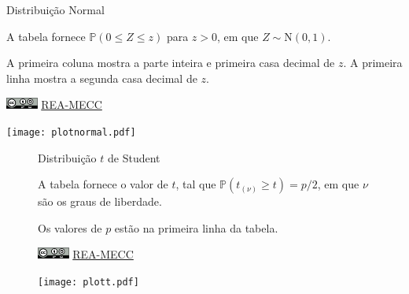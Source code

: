 \documentclass[a4paper,12pt]{article}
\begin{document}
\begin{minipage}[c]{.64\textwidth}

\begin{Huge}
Distribuição Normal
\end{Huge}

\vspace{2em}

A tabela fornece $\mathbb{P}(0 \leq Z \leq z)$ para $z>0$, em que $Z \sim \text{N}(0,1)$.

A primeira coluna mostra a parte inteira e primeira casa decimal de $z$.
A primeira linha mostra a segunda casa decimal de $z$.
\par\bigskip
\href{https://creativecommons.org/licenses/by-sa/4.0/deed.pt_BR}{\includegraphics[height=1em]{cc-by-sa.pdf}}
\href{https://rea-mecc.github.io}{REA-MECC}
\end{minipage}
\hfill
\begin{minipage}[c]{.35\textwidth}
\texttt{[image: plotnormal.pdf]}
\end{minipage}




\newpage


\begin{landscape}

\begin{figure}[h]
\begin{minipage}[c]{1\textwidth}

\begin{Huge}
Distribuição $t$ de Student
\end{Huge}

\vspace{2em}

A tabela fornece o valor de $t$, tal que $\mathbb{P}(t_{(\nu)} \geq t) = p/2$, em que $\nu$ são os graus de liberdade.

Os valores de $p$ estão na primeira linha da tabela.
\par\bigskip
\href{https://creativecommons.org/licenses/by-sa/4.0/deed.pt_BR}{\includegraphics[height=1em]{cc-by-sa.pdf}}
\href{https://rea-mecc.github.io}{REA-MECC}
\end{minipage}
\hfill
\begin{minipage}[c]{.3\textwidth}
\texttt{[image: plott.pdf]}
\end{minipage}
\end{figure}  



\end{landscape}
\end{document}
